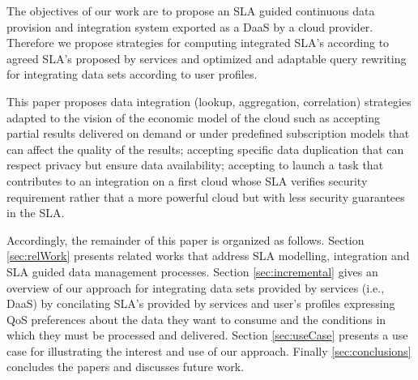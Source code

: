 The objectives of our work are to propose an SLA guided continuous data provision and integration system exported as a DaaS by a cloud provider. 
Therefore we propose strategies for computing integrated SLA’s according to agreed SLA’s proposed by services and optimized and adaptable query rewriting for integrating data sets  according to user profiles. 

This paper proposes data integration (lookup, aggregation, correlation) strategies adapted to the vision of the economic model of the cloud such as accepting partial results delivered on demand or under predefined subscription models that can affect the quality of the results; accepting specific data duplication that can respect privacy but ensure data availability; accepting to launch a task that contributes to an integration on a first cloud whose SLA verifies security requirement rather that a more powerful cloud but with less security guarantees in the SLA. 

Accordingly, the remainder of this paper is organized as follows. Section \ref{sec:relWork} presents related works that address SLA modelling, integration and SLA guided data management processes. Section \ref{sec:incremental} gives an overview of our approach for integrating data sets provided by services (i.e., DaaS) by concilating SLA's provided by services and user's profiles expressing QoS preferences about the data they want to consume and the conditions in which they must be processed and delivered. 
Section \ref{sec:useCase} presents a use case for illustrating the interest and use of our approach. Finally \ref{sec:conclusions} concludes the papers and discusses future work.